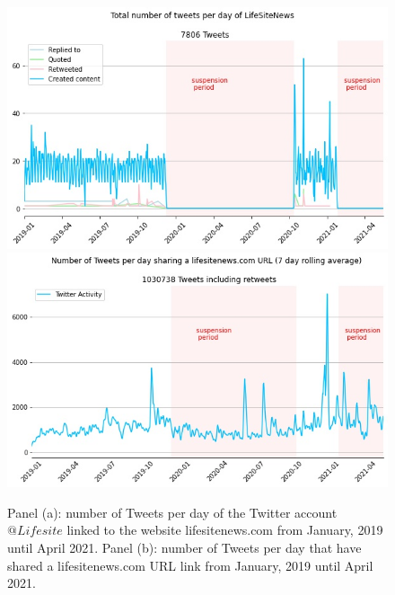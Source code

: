\documentclass{article}
\begin{document}
\begin{figure}
\centering
		\includegraphics[scale=0.35]{./img/lifesite.jpg} 
		\includegraphics[scale=0.35]{./img/lifesite_rolling_7_lifesite.jpg}
\caption{Panel (a): number of Tweets per day of the Twitter account $@Lifesite$ linked to the website lifesitenews.com from January, 2019 until April 2021. Panel (b): number of Tweets per day that have shared a lifesitenews.com URL link from January, 2019 until April 2021. }
\label{fig2}
\end{figure}
\end{document}
